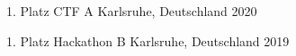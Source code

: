 



\begin{cvhonors}

  \cvhonor
    {1. Platz} %
    {CTF A} %
    {Karlsruhe, Deutschland} %
    {2020} %

  \cvhonor
    {1. Platz} %
    {Hackathon B} %
    {Karlsruhe, Deutschland} %
    {2019} %

\end{cvhonors}
